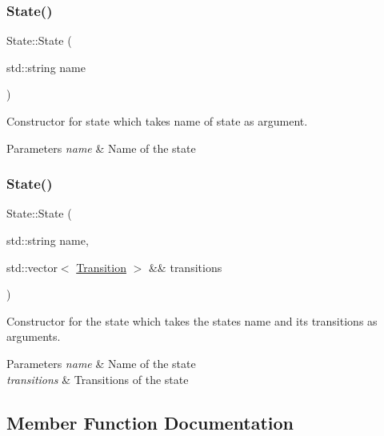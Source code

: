\subsubsection{\texorpdfstring{State()}{State()}\hspace{0.1cm}{\footnotesize\ttfamily [1/2]}}
{\footnotesize\ttfamily State\+::\+State (\begin{DoxyParamCaption}\item[{std\+::string}]{name }\end{DoxyParamCaption})\hspace{0.3cm}{\ttfamily [explicit]}}



Constructor for state which takes name of state as argument. 


\begin{DoxyParams}{Parameters}
{\em name} & Name of the state \\
\hline
\end{DoxyParams}
\mbox{\label{classState_afc0a48251083c35bb1acb67f1fb89f0e}} 
\subsubsection{\texorpdfstring{State()}{State()}\hspace{0.1cm}{\footnotesize\ttfamily [2/2]}}
{\footnotesize\ttfamily State\+::\+State (\begin{DoxyParamCaption}\item[{std\+::string}]{name,  }\item[{std\+::vector$<$ \hyperlink{classTransition}{Transition} $>$ \&\&}]{transitions }\end{DoxyParamCaption})}



Constructor for the state which takes the states name and its transitions as arguments. 


\begin{DoxyParams}{Parameters}
{\em name} & Name of the state \\
\hline
{\em transitions} & Transitions of the state \\
\hline
\end{DoxyParams}


\subsection{Member Function Documentation}
\mbox{\label{classState_afa47bb95d7a504a74d0cd9f5deb6893b}} 
